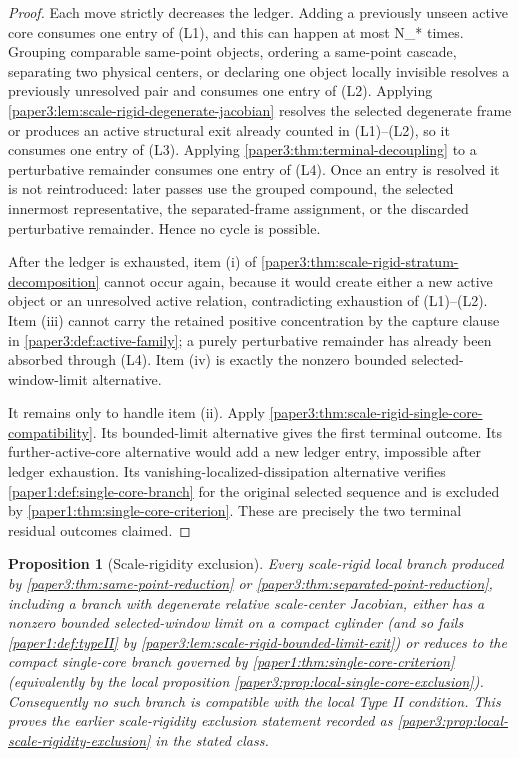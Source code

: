 \documentclass[11pt]{amsart}
\def\({}%
\def\){}%
\theoremstyle{plain}
\newtheorem{proposition}[proposition]{Proposition}
\theoremstyle{definition}
\theoremstyle{remark}
\begin{document}
\begin{proof}
Each move strictly decreases the ledger.  Adding a previously unseen active
core consumes one entry of \textup{(L1)}, and this can happen at most \(N_*\)
times.  Grouping comparable same-point objects, ordering a same-point cascade,
separating two physical centers, or declaring one object locally invisible
resolves a previously unresolved pair and consumes one entry of \textup{(L2)}.
Applying \cref{paper3:lem:scale-rigid-degenerate-jacobian} resolves the
selected degenerate frame or produces an active structural exit already counted
in \textup{(L1)}--\textup{(L2)}, so it consumes one entry of \textup{(L3)}.  Applying
\cref{paper3:thm:terminal-decoupling} to a perturbative remainder consumes one
entry of \textup{(L4)}.  Once an entry is resolved it is not reintroduced: later
passes use the grouped compound, the selected innermost representative, the
separated-frame assignment, or the discarded perturbative remainder.  Hence no
cycle is possible.

After the ledger is exhausted, item \textup{(i)} of
\cref{paper3:thm:scale-rigid-stratum-decomposition} cannot occur again, because
it would create either a new active object or an unresolved active relation,
contradicting exhaustion of \textup{(L1)}--\textup{(L2)}.  Item \textup{(iii)}
cannot carry the retained positive concentration by the capture clause in
\cref{paper3:def:active-family}; a purely perturbative remainder has already
been absorbed through \textup{(L4)}.
Item \textup{(iv)} is exactly the nonzero bounded selected-window-limit
alternative.

It remains only to handle item \textup{(ii)}.  Apply
\cref{paper3:thm:scale-rigid-single-core-compatibility}.  Its bounded-limit
alternative gives the first terminal outcome.  Its further-active-core
alternative would add a new ledger entry, impossible after ledger exhaustion.
Its vanishing-localized-dissipation alternative verifies
\cref{paper1:def:single-core-branch} for the original selected sequence and is
excluded by \cref{paper1:thm:single-core-criterion}.  These are precisely the
two terminal residual outcomes claimed.
\end{proof}

\begin{proposition}[Scale-rigidity exclusion]
\label{paper3:prop:scale-rigidity-discharged}
Every scale-rigid local branch produced by
\cref{paper3:thm:same-point-reduction} or
\cref{paper3:thm:separated-point-reduction}, including a branch with
degenerate relative scale-center Jacobian, either has a nonzero bounded
selected-window limit on a compact cylinder (and so fails
\cref{paper1:def:typeII} by
\cref{paper3:lem:scale-rigid-bounded-limit-exit}) or reduces to the compact
single-core branch governed by
\cref{paper1:thm:single-core-criterion} (equivalently by the local
proposition \cref{paper3:prop:local-single-core-exclusion}).  Consequently no such branch is
compatible with the local Type II condition.  This proves the earlier
scale-rigidity exclusion statement recorded as
\cref{paper3:prop:local-scale-rigidity-exclusion} in the stated class.
\end{proposition}
\end{document}
